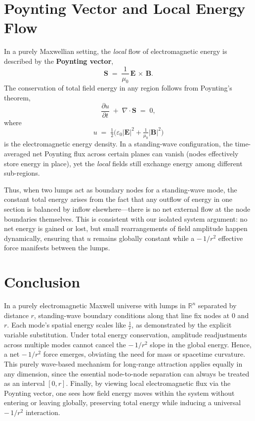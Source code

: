 \documentclass[12pt]{article}
\begin{document}
\section{Poynting Vector and Local Energy Flow}
In a purely Maxwellian setting, the \emph{local} flow of electromagnetic energy is described by the \textbf{Poynting vector}, 
\[
\mathbf{S} \;=\; \frac{1}{\mu_0}\,\mathbf{E}\,\times\,\mathbf{B}.
\]
The conservation of total field energy in any region follows from Poynting’s theorem,
\[
\frac{\partial u}{\partial t}
\;+\;
\nabla \cdot \mathbf{S}
\;=\;0,
\]
where 
\[
u \;=\; \tfrac12\bigl(\varepsilon_0|\mathbf{E}|^2 + \tfrac{1}{\mu_0}|\mathbf{B}|^2\bigr)
\]
is the electromagnetic energy density. In a standing-wave configuration, the time-averaged net Poynting flux across certain planes can vanish (nodes effectively store energy in place), yet the \emph{local} fields still exchange energy among different sub-regions. 

Thus, when two lumps act as boundary nodes for a standing-wave mode, the constant total energy arises from the fact that any outflow of energy in one section is balanced by inflow elsewhere—there is no net external flow at the node boundaries themselves. This is consistent with our isolated system argument: no net energy is gained or lost, but small rearrangements of field amplitude happen dynamically, ensuring that $u$ remains globally constant while a \(-\,1/r^2\) effective force manifests between the lumps.

\section{Conclusion}
In a purely electromagnetic Maxwell universe with lumps in \(\mathbb{R}^n\) separated by distance \(r\), standing-wave boundary conditions along that line fix nodes at \(0\) and \(r\). Each mode’s spatial energy scales like \(\tfrac{1}{r}\), as demonstrated by the explicit variable substitution. Under total energy conservation, amplitude readjustments across multiple modes cannot cancel the \(-\,1/r^2\) slope in the global energy. Hence, a net \(-\,1/r^2\) force emerges, obviating the need for mass or spacetime curvature. This purely wave-based mechanism for long-range attraction applies equally in any dimension, since the essential node-to-node separation can always be treated as an interval \([0,r]\). Finally, by viewing local electromagnetic flux via the Poynting vector, one sees how field energy moves within the system without entering or leaving globally, preserving total energy while inducing a universal \(-\,1/r^2\) interaction.
\end{document}
